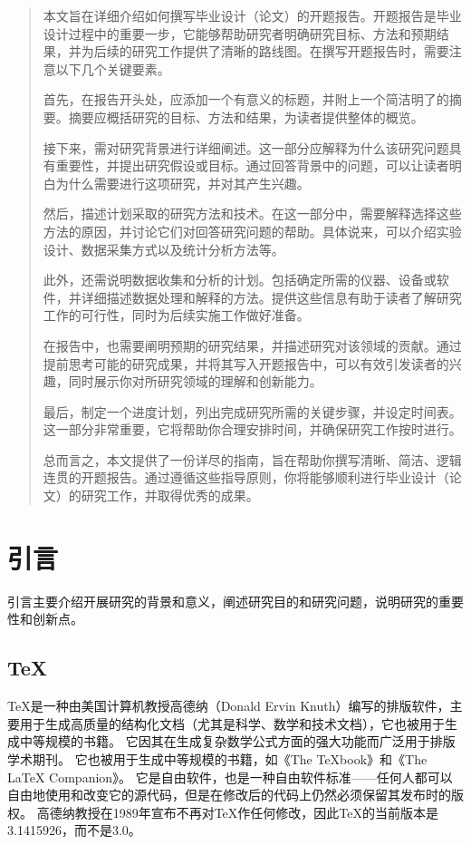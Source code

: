 \documentclass{suesreport}
\begin{document}
    \pagestyle{empty}
    \makecover
    \begin{abstract}
        本文旨在详细介绍如何撰写毕业设计（论文）的开题报告。开题报告是毕业设计过程中的重要一步，它能够帮助研究者明确研究目标、方法和预期结果，并为后续的研究工作提供了清晰的路线图。在撰写开题报告时，需要注意以下几个关键要素。

        首先，在报告开头处，应添加一个有意义的标题，并附上一个简洁明了的摘要。摘要应概括研究的目标、方法和结果，为读者提供整体的概览。

        接下来，需对研究背景进行详细阐述。这一部分应解释为什么该研究问题具有重要性，并提出研究假设或目标。通过回答背景中的问题，可以让读者明白为什么需要进行这项研究，并对其产生兴趣。

        然后，描述计划采取的研究方法和技术。在这一部分中，需要解释选择这些方法的原因，并讨论它们对回答研究问题的帮助。具体说来，可以介绍实验设计、数据采集方式以及统计分析方法等。

        此外，还需说明数据收集和分析的计划。包括确定所需的仪器、设备或软件，并详细描述数据处理和解释的方法。提供这些信息有助于读者了解研究工作的可行性，同时为后续实施工作做好准备。

        在报告中，也需要阐明预期的研究结果，并描述研究对该领域的贡献。通过提前思考可能的研究成果，并将其写入开题报告中，可以有效引发读者的兴趣，同时展示你对所研究领域的理解和创新能力。

        最后，制定一个进度计划，列出完成研究所需的关键步骤，并设定时间表。这一部分非常重要，它将帮助你合理安排时间，并确保研究工作按时进行。

        总而言之，本文提供了一份详尽的指南，旨在帮助你撰写清晰、简洁、逻辑连贯的开题报告。通过遵循这些指导原则，你将能够顺利进行毕业设计（论文）的研究工作，并取得优秀的成果。
        \vspace{0.1\textheight}
        
    \end{abstract}
    \begin{center}
        \heiti{}

        \wuhao\qquad
    \end{center}
    \section{引言}
    引言主要介绍开展研究的背景和意义，阐述研究目的和研究问题，说明研究的重要性和创新点。
    \subsection{\TeX{}}
    \TeX{}是一种由美国计算机教授高德纳（Donald Ervin Knuth）编写的排版软件，主要用于生成高质量的结构化文档（尤其是科学、数学和技术文档），它也被用于生成中等规模的书籍。
    它因其在生成复杂数学公式方面的强大功能而广泛用于排版学术期刊。
    它也被用于生成中等规模的书籍，如《The \TeX{}book》和《The \LaTeX{} Companion》。
    它是自由软件，也是一种自由软件标准——任何人都可以自由地使用和改变它的源代码，但是在修改后的代码上仍然必须保留其发布时的版权。
    高德纳教授在1989年宣布不再对\TeX{}作任何修改，因此\TeX{}的当前版本是3.1415926，而不是3.0。
\end{document}
